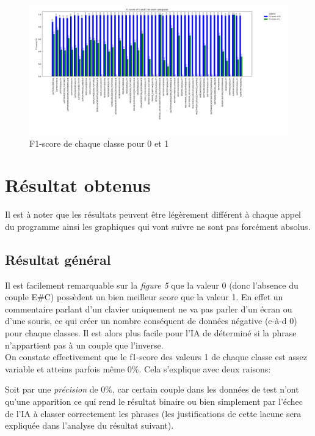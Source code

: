 \documentclass[12pt ,a4paper ]{article}
\begin{document}
\begin{multicols}{2}
\begin{figure}[t]
    \begin{center}
        \includegraphics[width=1.15\textwidth]{data_plot.png}
    \end{center}
    \caption{F1-score de chaque classe pour 0 et 1}
\end{figure}
\newpage
\section{Résultat obtenus}
Il est à noter que les résultats peuvent être légèrement différent à chaque appel du programme ainsi les graphiques qui vont suivre ne sont pas forcément absolus. 

\subsection{Résultat général}
Il est facilement remarquable sur la \textit{figure 5} que la valeur 0 (donc l'absence du couple E\#C) possèdent un bien meilleur score que la valeur 1. En effet un commentaire parlant d'un clavier uniquement ne va pas parler d'un écran ou d'une souris, ce qui créer un nombre conséquent de données négative (c-à-d 0) pour chaque classes. Il est alors plus facile pour l'IA de déterminé si la phrase n'appartient pas à un couple que l'inverse.\\

On constate effectivement que le f1-score des valeurs 1 de chaque classe est assez variable et atteins parfois même 0\%. Cela s'explique avec deux raisons: 
 
\noindent Soit par une \textit{précision} de 0\%, car certain couple dans les données de test n'ont qu'une apparition ce qui rend le résultat binaire ou bien simplement par l'échec de l'IA à classer correctement les phrases (les justifications de cette lacune sera expliquée dans l'analyse du résultat suivant). 


\end{multicols}
\end{document}
